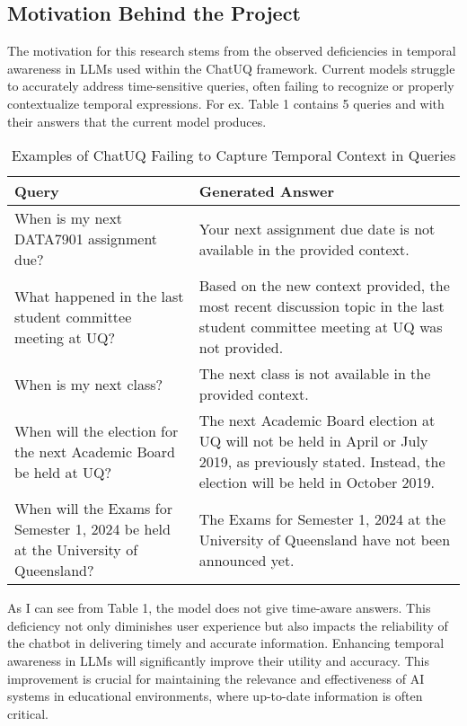 \subsection{Motivation Behind the Project}

The motivation for this research stems from the observed deficiencies in temporal awareness in LLMs used within the ChatUQ framework. Current models struggle to accurately address time-sensitive queries, often failing to recognize or properly contextualize temporal expressions. For ex. Table 1 contains 5 queries and with their answers that the current model produces. \\


\begin{table}[ht]
\label{tab:queries_answers}
\begin{tabular}{|p{}|p{}|}
\hline
\centering\textbf{Query} & \centering\textbf{Generated Answer} \tabularnewline
\hline
When is my next DATA7901 assignment due? & Your next assignment due date is not available in the provided context. \\
\hline
What happened in the last student committee meeting at UQ? & Based on the new context provided, the most recent discussion topic in the last student committee meeting at UQ was not provided. \\
\hline
When is my next class? & The next class is not available in the provided context. \\
\hline
When will the election for the next Academic Board be held at UQ? & The next Academic Board election at UQ will not be held in April or July 2019, as previously stated. Instead, the election will be held in October 2019. \\
\hline
When will the Exams for Semester 1, 2024 be held at the University of Queensland? & The Exams for Semester 1, 2024 at the University of Queensland have not been announced yet. \\
\hline
\end{tabular}
\centering
\caption{Examples of ChatUQ Failing to Capture Temporal Context in Queries}
\end{table}


As I can see from Table 1, the model does not give time-aware answers. This deficiency not only diminishes user experience but also impacts the reliability of the chatbot in delivering timely and accurate information. Enhancing temporal awareness in LLMs will significantly improve their utility and accuracy. This improvement is crucial for maintaining the relevance and effectiveness of AI systems in educational environments, where up-to-date information is often critical.

